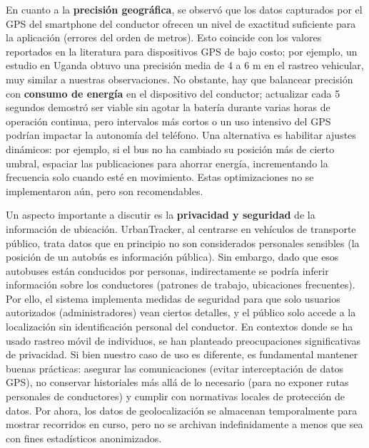 En cuanto a la \textbf{precisión geográfica}, se observó que los datos capturados por el GPS del smartphone del conductor ofrecen un nivel de exactitud suficiente para la aplicación (errores del orden de metros). Esto coincide con los valores reportados en la literatura para dispositivos GPS de bajo costo; por ejemplo, un estudio en Uganda obtuvo una precisión media de 4 a 6 m en el rastreo vehicular\cite{anyango2025uganda}, muy similar a nuestras observaciones. No obstante, hay que balancear precisión con \textbf{consumo de energía} en el dispositivo del conductor; actualizar cada 5 segundos demostró ser viable sin agotar la batería durante varias horas de operación continua, pero intervalos más cortos o un uso intensivo del GPS podrían impactar la autonomía del teléfono. Una alternativa es habilitar ajustes dinámicos: por ejemplo, si el bus no ha cambiado su posición más de cierto umbral, espaciar las publicaciones para ahorrar energía, incrementando la frecuencia solo cuando esté en movimiento. Estas optimizaciones no se implementaron aún, pero son recomendables.

Un aspecto importante a discutir es la \textbf{privacidad y seguridad} de la información de ubicación. UrbanTracker, al centrarse en vehículos de transporte público, trata datos que en principio no son considerados personales sensibles (la posición de un autobús es información pública). Sin embargo, dado que esos autobuses están conducidos por personas, indirectamente se podría inferir información sobre los conductores (patrones de trabajo, ubicaciones frecuentes). Por ello, el sistema implementa medidas de seguridad para que solo usuarios autorizados (administradores) vean ciertos detalles, y el público solo accede a la localización sin identificación personal del conductor. En contextos donde se ha usado rastreo móvil de individuos, se han planteado preocupaciones significativas de privacidad. Si bien nuestro caso de uso es diferente, es fundamental mantener buenas prácticas: asegurar las comunicaciones (evitar interceptación de datos GPS), no conservar historiales más allá de lo necesario (para no exponer rutas personales de conductores) y cumplir con normativas locales de protección de datos. Por ahora, los datos de geolocalización se almacenan temporalmente para mostrar recorridos en curso, pero no se archivan indefinidamente a menos que sea con fines estadísticos anonimizados.

